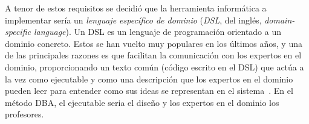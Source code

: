 A tenor de estos requisitos se decidió que la herramienta informática a implementar sería un \emph{lenguaje específico de dominio} (\emph{DSL}, del inglés, \emph{domain-specific language}). Un DSL es un lenguaje de programación orientado a un dominio concreto. Estos se han vuelto muy populares en los últimos años, y una de las principales razones es que facilitan la comunicación con los expertos en el dominio, proporcionando un texto común (código escrito en el DSL) que actúa a la vez como ejecutable y como una descripción que los expertos en el dominio pueden leer para entender como sus ideas se representan en el sistema~\cite{fowler2010domain}. En el método DBA, el ejecutable seria el diseño y los expertos en el dominio los profesores.








 











